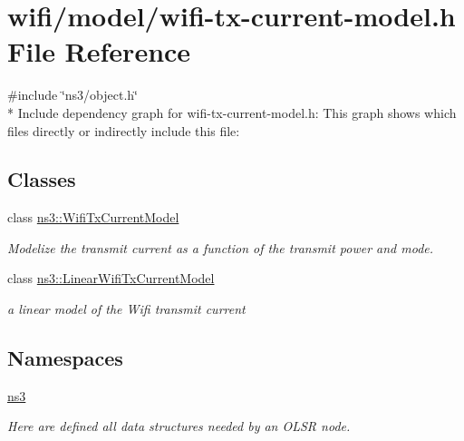 \hypertarget{wifi-tx-current-model_8h}{}\section{wifi/model/wifi-\/tx-\/current-\/model.h File Reference}
\label{wifi-tx-current-model_8h}
{\ttfamily \#include \char`\"{}ns3/object.\+h\char`\"{}}\\*
Include dependency graph for wifi-\/tx-\/current-\/model.h\+:
This graph shows which files directly or indirectly include this file\+:
\subsection*{Classes}
\begin{DoxyCompactItemize}
\item 
class \hyperlink{classns3_1_1WifiTxCurrentModel}{ns3\+::\+Wifi\+Tx\+Current\+Model}
\begin{DoxyCompactList}\small\item\em Modelize the transmit current as a function of the transmit power and mode. \end{DoxyCompactList}\item 
class \hyperlink{classns3_1_1LinearWifiTxCurrentModel}{ns3\+::\+Linear\+Wifi\+Tx\+Current\+Model}
\begin{DoxyCompactList}\small\item\em a linear model of the Wifi transmit current \end{DoxyCompactList}\end{DoxyCompactItemize}
\subsection*{Namespaces}
\begin{DoxyCompactItemize}
\item 
 \hyperlink{namespacens3}{ns3}
\begin{DoxyCompactList}\small\item\em Here are defined all data structures needed by an O\+L\+SR node. \end{DoxyCompactList}\end{DoxyCompactItemize}
